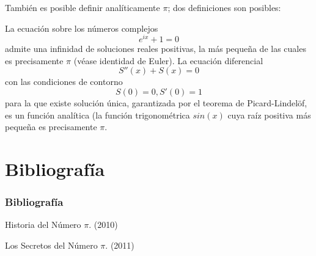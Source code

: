 \documentclass{beamer}
\begin{document}
\begin{frame}

  También es posible definir analíticamente $\pi$; dos definiciones son posibles:

    La ecuación sobre los números complejos \[ e^{ix}+1=0 \] admite una infinidad de soluciones reales positivas, la más pequeña de las cuales es precisamente $\pi$ (véase identidad de Euler).
    La ecuación diferencial \[ S''(x)+S(x)=0 \] con las condiciones de contorno \[ S(0)=0, S'(0)=1 \] para la que existe solución única, garantizada por el teorema de Picard-Lindelöf, es un función analítica (la función trigonométrica $sin(x)$ cuya raíz positiva más pequeña es precisamente $\pi$.

\end{frame}

\section{Bibliografía}
\begin{frame}

  \frametitle{Bibliografía}
  
  \begin{thebibliography}{10}
    \beamertemplatebookbibitems
    Historia del Número $\pi$.
    (2010)

    \beamertemplatebookbibitems
    Los Secretos del Número $\pi$.
    (2011)

\end{thebibliography}
\end{frame}

\end{document}
